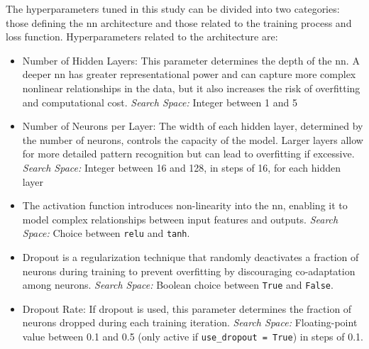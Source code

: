 The hyperparameters tuned in this study can be divided into two categories: those defining the \ac{nn} architecture and those related to the training process and loss function. Hyperparameters related to the architecture are:
\begin{itemize}
	\item Number of Hidden Layers: This parameter determines the depth of the \ac{nn}. A deeper \ac{nn} has greater representational power and can capture more complex nonlinear relationships in the data, but it also increases the risk of overfitting and computational cost. \newline
	      \textit{Search Space:} Integer between 1 and 5
	\item Number of Neurons per Layer: The width of each hidden layer, determined by the number of neurons, controls the capacity of the model. Larger layers allow for more detailed pattern recognition but can lead to overfitting if excessive. \newline
	      \textit{Search Space:} Integer between 16 and 128, in steps of 16, for each hidden layer
	\item The activation function introduces non-linearity into the \ac{nn}, enabling it to model complex relationships between input features and outputs. \newline
	      \textit{Search Space:} Choice between \texttt{\ac{relu}} and \texttt{\ac{tanh}}.
	\item Dropout is a regularization technique that randomly deactivates a fraction of neurons during training to prevent overfitting by discouraging co-adaptation among neurons. \newline
	      \textit{Search Space:} Boolean choice between \texttt{True} and \texttt{False}.
	\item Dropout Rate: If dropout is used, this parameter determines the fraction of neurons dropped during each training iteration. \newline
	      \textit{Search Space:} Floating-point value between 0.1 and 0.5 (only active if \texttt{use\_dropout = True}) in steps of 0.1.
\end{itemize}

